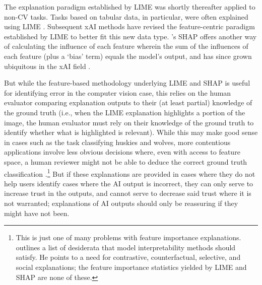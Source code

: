 The explanation paradigm established by LIME was shortly thereafter applied to non-CV tasks. Tasks based on tabular data, in particular, were often explained using LIME \cite{zerilli_explaining_2020}. Subsequent xAI methods have revised the feature-centric paradigm established by LIME to better fit this new data type. \textcite{lundberg_unified_2017}'s SHAP offers another way of calculating the influence of each feature wherein the sum of the influences of each feature (plus a `bias' term) equals the model's output, and has since grown ubiquitous in the xAI field \cite{weerts_human-grounded_2019}.

But while the feature-based methodology underlying LIME and SHAP is useful for identifying error in the computer vision case, this relies on the human evaluator comparing explanation outputs to their (at least partial) knowledge of the ground truth (i.e., when the LIME explanation highlights a portion of the image, the human evaluator must rely on their knowledge of the ground truth to identify whether what is highlighted is relevant). While this may make good sense in cases such as the task classifying huskies and wolves, more contentious applications involve less obvious decisions where, even with access to feature space, a human reviewer might not be able to deduce the correct ground truth classification \cite{kumar_problems_2020,markus_role_2021}.\footnote{This is just one of many problems with feature importance explanations. \textcite{miller_explanation_2017} outlines a list of desiderata that model interpretability methods should satisfy. He points to a need for contrastive, counterfactual, selective, and social explanations; the feature importance statistics yielded by LIME and SHAP are none of these.} But if these explanations are provided in cases where they do not help users identify cases where the AI output is incorrect, they can only serve to increase trust in the outputs, and cannot serve to decrease said trust where it is not warranted; explanations of AI outputs should only be reassuring if they might have not been.

